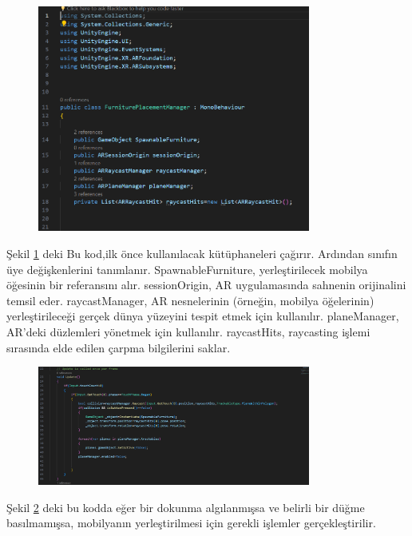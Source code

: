 \documentclass[12pt, a4paper]{article}
\begin{document}
	\newpage
	\begin{figure}[!ht]
		\caption{}
		\centering
		\includegraphics[width=0.8\textwidth]{Ekran.PNG}
		
		\label{mobilya1}
	\end{figure}
	Şekil \ref{mobilya1} deki Bu kod,ilk önce kullanılacak kütüphaneleri çağırır. Ardından  sınıfın üye değişkenlerini tanımlanır. SpawnableFurniture, yerleştirilecek mobilya öğesinin bir referansını alır. sessionOrigin, AR uygulamasında sahnenin orijinalini temsil eder. raycastManager, AR nesnelerinin (örneğin, mobilya öğelerinin) yerleştirileceği gerçek dünya yüzeyini tespit etmek için kullanılır. planeManager, AR'deki düzlemleri yönetmek için kullanılır. raycastHits, raycasting işlemi sırasında elde edilen çarpma bilgilerini saklar.\cite{drive}
	\begin{figure}[!ht]
		\caption{}
		\centering
		\includegraphics[width=0.8\textwidth]{Ekran2.PNG}
		
		\label{mobilya2}
	\end{figure}
	\newpage
	Şekil \ref{mobilya2} deki bu kodda eğer bir dokunma algılanmışsa ve belirli bir düğme basılmamışsa, mobilyanın yerleştirilmesi için gerekli işlemler gerçekleştirilir.\cite{drive}
	
\end{document}
